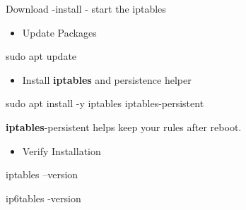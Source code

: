\begin{frame}[t,allowframebreaks]{Download -install - start the iptables}
  \fontsize{15}{18}\selectfont
  \begin{itemize}
    \item Update Packages
  \end{itemize}
  \vspace{0.08cm}
  {\color{CommandGreen}\ttfamily\fontsize{13.5}{16.5}\selectfont sudo apt update\par}
  \begin{itemize}
    \item Install \textcolor{CommandGreen}{\bfseries iptables} and persistence helper
  \end{itemize}
  \vspace{0.08cm}
  {\color{CommandGreen}\ttfamily\fontsize{13.5}{16.5}\selectfont sudo apt install -y iptables iptables-persistent\par}
  \textcolor{CommandGreen}{\bfseries iptables}-persistent helps keep your rules after reboot.\par
  \begin{itemize}
    \item Verify Installation
  \end{itemize}
  \vspace{0.08cm}
  {\color{CommandGreen}\ttfamily\fontsize{13.5}{16.5}\selectfont iptables --version\par}
  \vspace{0.08cm}
  {\color{CommandGreen}\ttfamily\fontsize{13.5}{16.5}\selectfont ip6tables -version\par}
\end{frame}
